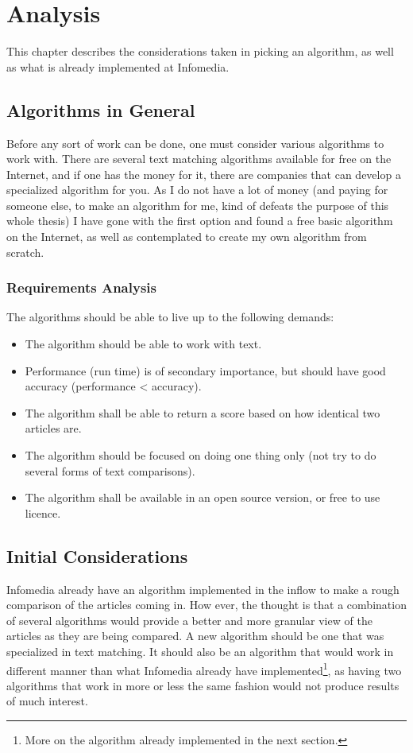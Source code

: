 \chapter{Analysis}

This chapter describes the considerations taken in picking an algorithm, as well as what is already implemented at Infomedia.

\section{Algorithms in General}
Before any sort of work can be done, one must consider various algorithms to work with. There are several text matching algorithms available for free on the Internet, and if one has the money for it, there are companies that can develop a specialized algorithm for you. As I do not have a lot of money (and paying for someone else, to make an algorithm for me, kind of defeats the purpose of this whole thesis) I have gone with the first option and found a free basic algorithm on the Internet, as well as contemplated to create my own algorithm from scratch.

\subsection{Requirements Analysis}
The algorithms should be able to live up to the following demands:

\begin{itemize}
	\item The algorithm should be able to work with text.
	\item Performance (run time) is of secondary importance, but should have good accuracy (performance < accuracy).
	\item The algorithm shall be able to return a score based on how identical two articles are.
	\item The algorithm should be focused on doing one thing only (not try to do several forms of text comparisons).
	\item The algorithm shall be available in an open source version, or free to use licence.
\end{itemize}

\section{Initial Considerations}
Infomedia already have an algorithm implemented in the inflow to make a rough comparison of the articles coming in. How ever, the thought is that a combination of several algorithms would provide a better and more granular view of the articles as they are being compared. A new algorithm should be one that was specialized in text matching. It should also be an algorithm that would work in different manner than what Infomedia already have implemented\footnote{More on the algorithm already implemented in the next section.}, as having two algorithms that work in more or less the same fashion would not produce results of much interest.


